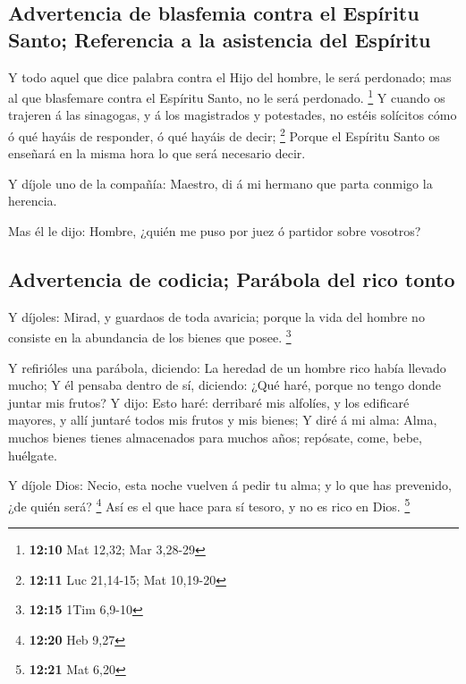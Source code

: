 \hypertarget{advertencia-de-blasfemia-contra-el-espuxedritu-santo-referencia-a-la-asistencia-del-espuxedritu}{%
\subsection{Advertencia de blasfemia contra el Espíritu Santo;
Referencia a la asistencia del
Espíritu}\label{advertencia-de-blasfemia-contra-el-espuxedritu-santo-referencia-a-la-asistencia-del-espuxedritu}}

 Y todo aquel que dice palabra contra el Hijo del hombre,
le será perdonado; mas al que blasfemare contra el Espíritu Santo, no le
será perdonado. \footnote{\textbf{12:10} Mat 12,32; Mar 3,28-29}
 Y cuando os trajeren á las sinagogas, y á los
magistrados y potestades, no estéis solícitos cómo ó qué hayáis de
responder, ó qué hayáis de decir; \footnote{\textbf{12:11} Luc 21,14-15;
  Mat 10,19-20}  Porque el Espíritu Santo os enseñará en
la misma hora lo que será necesario decir.

 Y díjole uno de la compañía: Maestro, di á mi hermano
que parta conmigo la herencia.

 Mas él le dijo: Hombre, ¿quién me puso por juez ó
partidor sobre vosotros?

\hypertarget{advertencia-de-codicia-paruxe1bola-del-rico-tonto}{%
\subsection{Advertencia de codicia; Parábola del rico
tonto}\label{advertencia-de-codicia-paruxe1bola-del-rico-tonto}}

 Y díjoles: Mirad, y guardaos de toda avaricia; porque la
vida del hombre no consiste en la abundancia de los bienes que posee.
\footnote{\textbf{12:15} 1Tim 6,9-10}

 Y refirióles una parábola, diciendo: La heredad de un
hombre rico había llevado mucho;  Y él pensaba dentro de
sí, diciendo: ¿Qué haré, porque no tengo donde juntar mis frutos?
 Y dijo: Esto haré: derribaré mis alfolíes, y los
edificaré mayores, y allí juntaré todos mis frutos y mis bienes;
 Y diré á mi alma: Alma, muchos bienes tienes almacenados
para muchos años; repósate, come, bebe, huélgate.

 Y díjole Dios: Necio, esta noche vuelven á pedir tu
alma; y lo que has prevenido, ¿de quién será? \footnote{\textbf{12:20}
  Heb 9,27}  Así es el que hace para sí tesoro, y no es
rico en Dios. \footnote{\textbf{12:21} Mat 6,20}

